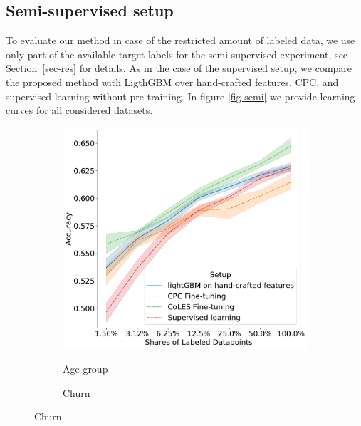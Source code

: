 \documentclass[sigconf]{acmart}
\begin{document}
\iffalse

\subsection{Semi-supervised setup} \label{app-sec-semi}

To evaluate our method in case of the restricted amount of labeled data, we use only part of the available target labels for the semi-supervised experiment, see Section~\ref{sec-res} for details. As in the case of the supervised setup, we compare the proposed method with LigthGBM over hand-crafted features, CPC, and supervised learning without pre-training. In figure \ref{fig-semi} we provide learning curves for all considered datasets.

\begin{figure}
  \centering
  \begin{subfigure}{0.5\linewidth}
    \caption{Age group}
    \includegraphics[width=\linewidth]{figures/ss_age_pred_per.pdf}
    \label{fig-semi-age2}
  \end{subfigure}%
  \begin{subfigure}{0.5\linewidth}
    \caption{Churn}

\end{subfigure}
\end{figure}
\end{document}
